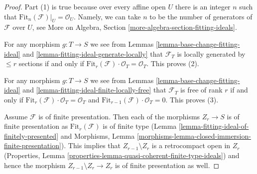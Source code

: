 \documentclass[10pt,a4paper]{amsart}
\theoremstyle{plain}
\theoremstyle{definition}
\theoremstyle{remark}
\numberwithin{equation}{subsection}
\begin{document}
\begin{proof}
Part (1) is true because over every affine open $U$ there is an integer $n$
such that $\text{Fit}_n(\mathcal{F})|_U = \mathcal{O}_U$. Namely, we can
take $n$ to be the number of generators of $\mathcal{F}$ over $U$, see
More on Algebra, Section \ref{more-algebra-section-fitting-ideals}.

\medskip\noindent
For any morphism $g : T \to S$ we see from
Lemmas \ref{lemma-base-change-fitting-ideal} and
\ref{lemma-fitting-ideal-generate-locally}
that $\mathcal{F}_T$ is locally generated by $\leq r$ sections if and only if
$\text{Fit}_r(\mathcal{F}) \cdot \mathcal{O}_T = \mathcal{O}_T$.
This proves (2).

\medskip\noindent
For any morphism $g : T \to S$ we see from
Lemmas \ref{lemma-base-change-fitting-ideal} and
\ref{lemma-fitting-ideal-finite-locally-free}
that $\mathcal{F}_T$ is free of rank $r$ if and only if
$\text{Fit}_r(\mathcal{F}) \cdot \mathcal{O}_T = \mathcal{O}_T$ and
$\text{Fit}_{r - 1}(\mathcal{F}) \cdot \mathcal{O}_T = 0$.
This proves (3).

\medskip\noindent
Assume $\mathcal{F}$ is of finite presentation. Then each of the morphisms
$Z_r \to S$ is of finite presentation as $\text{Fit}_r(\mathcal{F})$
is of finite type (Lemma \ref{lemma-fitting-ideal-of-finitely-presented} and
Morphisms, Lemma \ref{morphisms-lemma-closed-immersion-finite-presentation}).
This implies that $Z_{r - 1} \setminus Z_r$ is a retrocompact open in $Z_r$
(Properties, Lemma \ref{properties-lemma-quasi-coherent-finite-type-ideals})
and hence the morphism $Z_{r - 1} \setminus Z_r \to Z_r$
is of finite presentation as well.
\end{proof}
\end{document}
